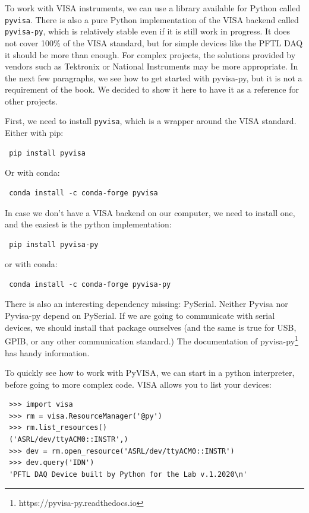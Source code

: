 To work with VISA instruments, we can use a library available for Python called \texttt{pyvisa}. There is also a pure Python implementation of the VISA backend called \texttt{pyvisa-py}, which is relatively stable even if it is still work in progress. It does not cover 100\% of the VISA standard, but for simple devices like the {PFTL DAQ} it should be more than enough. For complex projects, the solutions provided by vendors such as Tektronix or National Instruments may be more appropriate. In the next few paragraphs, we see how to get started with pyvisa-py, but it is not a requirement of the book. We decided to show it here to have it as a reference for other projects.

First, we need to install \texttt{pyvisa}, which is a wrapper around the VISA standard. Either with pip:

\begin{verbatim}
 pip install pyvisa
\end{verbatim}

Or with conda:

\begin{verbatim}
 conda install -c conda-forge pyvisa
\end{verbatim}

In case we don't have a VISA backend on our computer, we need to install one, and the easiest is the python implementation:

\begin{verbatim}
 pip install pyvisa-py
\end{verbatim}

or with conda:

\begin{verbatim}
 conda install -c conda-forge pyvisa-py
\end{verbatim}

There is also an interesting dependency missing: PySerial. Neither Pyvisa nor Pyvisa-py depend on PySerial. If we are going to communicate with serial devices, we should install that package ourselves (and the same is true for USB, GPIB, or any other communication standard.) The documentation of pyvisa-py\footnote{https://pyvisa-py.readthedocs.io} has handy information.

To quickly see how to work with PyVISA, we can start in a python interpreter, before going to more complex code. VISA allows you to list your devices:

\begin{verbatim}
 >>> import visa
 >>> rm = visa.ResourceManager('@py')
 >>> rm.list_resources()
 ('ASRL/dev/ttyACM0::INSTR',)
 >>> dev = rm.open_resource('ASRL/dev/ttyACM0::INSTR')
 >>> dev.query('IDN')
 'PFTL DAQ Device built by Python for the Lab v.1.2020\n'
\end{verbatim}

